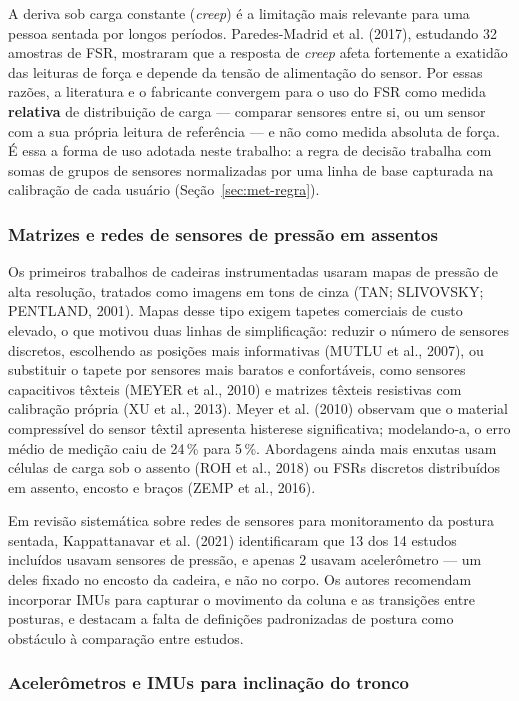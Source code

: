 A deriva sob carga constante (\emph{creep}) é a limitação mais relevante para uma
pessoa sentada por longos períodos. Paredes-Madrid et al. (2017), estudando 32
amostras de FSR, mostraram que a resposta de \emph{creep} afeta fortemente a
exatidão das leituras de força e depende da tensão de alimentação do sensor. Por
essas razões, a literatura e o fabricante convergem para o uso do FSR como medida
\textbf{relativa} de distribuição de carga --- comparar sensores entre si, ou um
sensor com a sua própria leitura de referência --- e não como medida absoluta de
força. É essa a forma de uso adotada neste trabalho: a regra de decisão trabalha
com somas de grupos de sensores normalizadas por uma linha de base capturada na
calibração de cada usuário (Seção~\ref{sec:met-regra}).

\subsubsection{Matrizes e redes de sensores de pressão em assentos}
\label{sec:rev-matrizes}

Os primeiros trabalhos de cadeiras instrumentadas usaram mapas de pressão de alta
resolução, tratados como imagens em tons de cinza (TAN; SLIVOVSKY; PENTLAND, 2001).
Mapas desse tipo exigem tapetes comerciais de custo elevado, o que motivou duas
linhas de simplificação: reduzir o número de sensores discretos, escolhendo as
posições mais informativas (MUTLU et al., 2007), ou substituir o tapete por
sensores mais baratos e confortáveis, como sensores capacitivos têxteis (MEYER et
al., 2010) e matrizes têxteis resistivas com calibração própria (XU et al., 2013).
Meyer et al. (2010) observam que o material compressível do sensor têxtil apresenta
histerese significativa; modelando-a, o erro médio de medição caiu de 24\,\% para
5\,\%. Abordagens ainda mais enxutas usam células de carga sob o assento (ROH et
al., 2018) ou FSRs discretos distribuídos em assento, encosto e braços (ZEMP et al.,
2016).

Em revisão sistemática sobre redes de sensores para monitoramento da postura
sentada, Kappattanavar et al. (2021) identificaram que 13 dos 14 estudos incluídos
usavam sensores de pressão, e apenas 2 usavam acelerômetro --- um deles fixado no
encosto da cadeira, e não no corpo. Os autores recomendam incorporar IMUs para
capturar o movimento da coluna e as transições entre posturas, e destacam a falta
de definições padronizadas de postura como obstáculo à comparação entre estudos.

\subsubsection{Acelerômetros e IMUs para inclinação do tronco}
\label{sec:rev-imu}

